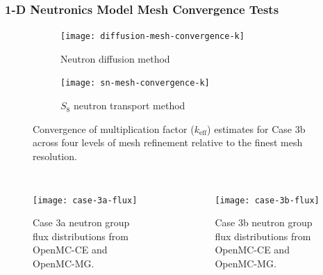 \begin{frame}[noframenumbering]
  \frametitle{1-D Neutronics Model Mesh Convergence Tests}
  \begin{figure}[t]
    \centering
    \begin{subfigure}[b]{0.48\columnwidth}
      \centering
      \texttt{[image: diffusion-mesh-convergence-k]}
      \caption{Neutron diffusion method}
      \label{fig:diff-mesh-k}
    \end{subfigure}
    \hfill
    \begin{subfigure}[b]{0.48\columnwidth}
      \centering
      \texttt{[image: sn-mesh-convergence-k]}
      \caption{$S_8$ neutron transport method}
      \label{fig:sn-mesh-k}
    \end{subfigure}
    \caption{Convergence of multiplication factor ($k_\text{eff}$) estimates for Case 3b across four
      levels of mesh refinement relative to the finest mesh resolution.}
    \label{fig:mesh-k}
  \end{figure}
\end{frame}

\begin{frame}[noframenumbering]
  \begin{columns}
    \column{5.5cm}
    \begin{figure}[htb!]
      \centering
      \texttt{[image: case-3a-flux]}
      \caption{Case 3a neutron group flux distributions from OpenMC-CE and OpenMC-MG.}
      \label{fig:3a-flux}
    \end{figure}
    \column{5.5cm}
    \begin{figure}[htb!]
      \centering
      \texttt{[image: case-3b-flux]}
      \caption{Case 3b neutron group flux distributions from OpenMC-CE and OpenMC-MG.}
      \label{fig:3b-flux}
    \end{figure}
  \end{columns}
\end{frame}

